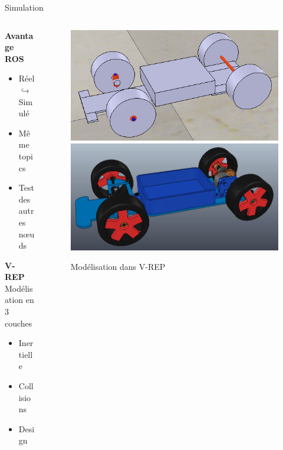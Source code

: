 \documentclass[french]{beamer}
\begin{document}
    \begin{frame}{Simulation}
        \begin{columns}
            \begin{column}{0.5\textwidth}
                \vspace{0.3cm}
                \textbf{Avantage ROS}
                \begin{itemize}
                    \item Réel $\hookrightarrow$ Simulé
                    \item Même topics
                    \item Test des autres n\oe uds
                \end{itemize}
                \textbf{V-REP} \\ Modélisation en 3 couches
                \begin{itemize}
                    \item Inertielle
                    \item Collisions
                    \item Design
                \end{itemize}
            \end{column}

            \begin{column}{0.5\textwidth}
                \centering
                \begin{figure}
                    \includegraphics[width=\textwidth]{Images/collide.png}
                    \includegraphics[width=\textwidth]{Images/real.png}
                    \caption{Modélisation dans V-REP}
                \end{figure}
            \end{column}
        \end{columns}


\end{frame}
\end{document}
